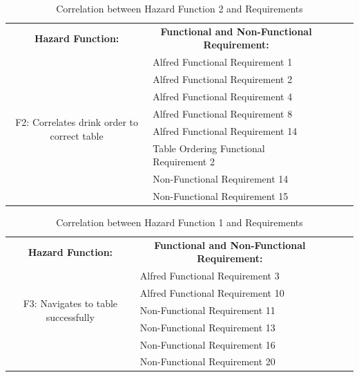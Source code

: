 \documentclass [10pt]{article}
\begin{document}

\begin{table}[H]
\centering
\begin{tabular}{|c|l|lll}
\cline{1-2}
\textbf{Hazard Function:}  & \multicolumn{1}{c|}{\textbf{Functional and Non-Functional Requirement:}} &  &  &  \\ \cline{1-2}
\multirow{8}{*}{F2: Correlates drink order to correct table} 
					& Alfred Functional Requirement 1			&  &  &  \\ \cline{2-2}
                                          & Alfred Functional Requirement 2			&  &  &  \\ \cline{2-2}
                                          & Alfred Functional Requirement 4			&  &  &  \\ \cline{2-2}
                                          & Alfred Functional Requirement 8			&  &  &  \\ \cline{2-2}
                                          & Alfred Functional Requirement 14			&  &  &  \\ \cline{2-2}
                                          & Table Ordering Functional Requirement 2	&  &  &  \\ \cline{2-2}
                                          & Non-Functional Requirement 14			&  &  &  \\ \cline{2-2}
                                          & Non-Functional Requirement 15 			&  &  &  \\ \cline{1-2}
\end{tabular}
\caption{Correlation between Hazard Function 2 and Requirements}  
\end{table}




\begin{table}[H]
\centering
\begin{tabular}{|c|l|lll}
\cline{1-2}
\textbf{Hazard Function:} & \multicolumn{1}{c|}{\textbf{Functional and Non-Functional Requirement:}} &  &  &  \\ \cline{1-2}
\multirow{5}{*}{F3: Navigates to table successfully} 
				& Alfred Functional Requirement 3		&  &  &  \\ \cline{2-2}
                                  & Alfred Functional Requirement 10		&  &  &  \\ \cline{2-2}
                                  & Non-Functional Requirement 11		&  &  &  \\ \cline{2-2}
                                  & Non-Functional Requirement 13 		&  &  &  \\ \cline{2-2}
                                  & Non-Functional Requirement 16 		&  &  &  \\ \cline{2-2}
                                  & Non-Functional Requirement 20		&  &  &  \\ \cline{1-2}
\end{tabular}
\caption{Correlation between Hazard Function 1 and Requirements}  
\end{table}
\end{document}
